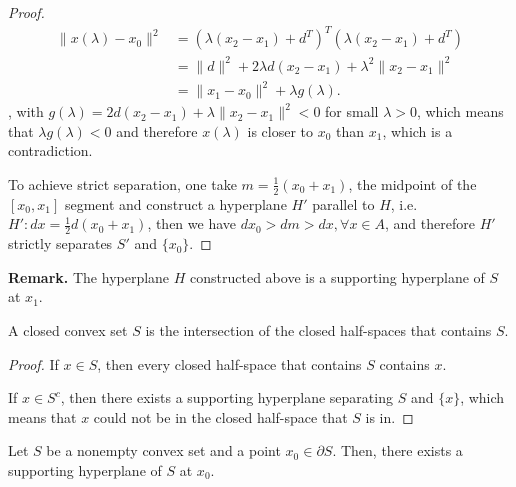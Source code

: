 \begin{proof}
  \begin{align*}
    \|x(\lambda)-x_{0}\|^2 &= (\lambda(x_{2}-x_{1}) + d^{T})^{T}(\lambda(x_{2}-x_{1})
    + d^{T})\\
                           &= \|d\|^2 + 2\lambda d(x_{2}-x_{1}) + \lambda
                           ^2\|x_{2}-x_{1}\|^2\\
                           &= \|x_{1}-x_{0}\|^2 + \lambda g(\lambda)
  .\end{align*},
  with \( g(\lambda) = 2d(x_{2}-x_{1}) + \lambda \|x_{2}-x_{1}\|^2 < 0 \) for
  small \( \lambda > 0 \), which means that \( \lambda g(\lambda) < 0 \) and
  therefore \( x(\lambda) \) is closer to \( x_{0} \) than \( x_{1} \), which is
  a contradiction.

  To achieve strict separation, one take \( m = \frac{1}{2}(x_{0} + x_{1}) \),
  the midpoint of the \( [x_{0}, x_{1}] \) segment and construct a hyperplane \(
  H' \) parallel to \( H \), i.e. \( H': dx = \frac{1}{2}d(x_{0} + x_{1}) \),
  then we have \( dx_{0} > dm > dx, \forall  x \in A \), and therefore \( H' \)
  strictly separates \( S' \) and \( \{ x_{0}\}   \).
\end{proof}

\textbf{Remark. } The hyperplane \( H \) constructed above is a supporting
  hyperplane of \( S \) at \( x_{1} \).

\begin{corollary}
  A closed convex set \( S \) is the intersection of the closed half-spaces that
  contains \( S \).
\end{corollary}

\begin{proof}
  If \( x \in S \), then every closed half-space that contains \( S \) contains
  \( x \).

  If \( x \in S^{c} \), then there exists a supporting hyperplane separating \(
  S\) and \( \{x\}   \), which means that \( x \) could not be in the closed
  half-space that \( S \) is in.
\end{proof}


\begin{theorem}
  \label{thr:Supporting Hyperplane Theorem}
  Let \( S \) be a nonempty convex set and a point \( x_{0} \in \partial S \).
  Then, there exists a supporting hyperplane of \( S \) at \( x_{0} \).
\end{theorem}

